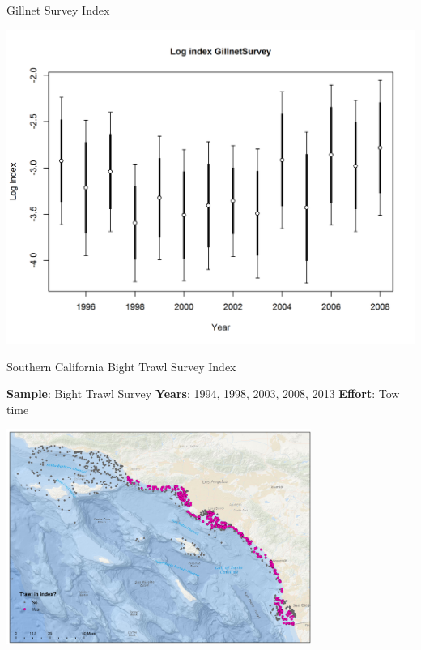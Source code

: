 \documentclass[ignorenonframetext,]{beamer}
\begin{document}
\begin{frame}{Gillnet Survey Index}

\includegraphics{r4ss/plots_mod1/index4_logcpuedata_GillnetSurvey.png}

\end{frame}

\begin{frame}{Southern California Bight Trawl Survey Index}

\textbf{Sample}: Bight Trawl Survey \textbf{Years}: 1994, 1998, 2003,
2008, 2013 \textbf{Effort}: Tow time

\includegraphics[height=7cm]{Figures/Fleet11_SCBSurvey_map.pdf}

\end{frame}
\end{document}
